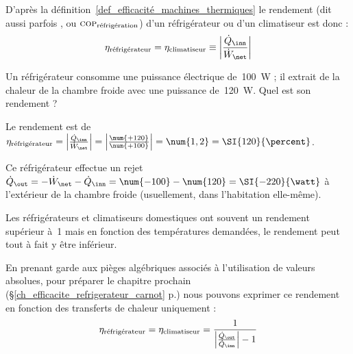		D’après la définition~\ref{def_efficacité_machines_thermiques} le rendement (dit aussi parfois , ou $\textsc{cop}_\text{réfrigération}$) d’un réfrigérateur ou d’un climatiseur est donc :
		\begin{equation}
			\eta_\text{réfrigérateur} = \eta _\text{climatiseur} \equiv \left| \frac{\dot Q_\inn}{\dot W_\net} \right|
			\label{def_rendement_climatiseur_refrigerateur}
		\end{equation}

		\onlyframabook{\clearfloats}
		\begin{anexample}
			Un réfrigérateur consomme une puissance électrique de~\SI{100}{\watt} ; il extrait de la chaleur de la chambre froide avec une puissance de~\SI{120}{\watt}. Quel est son rendement ?
	
			\begin{answer}
				Le rendement est de $\eta_\text{réfrigérateur} = \left| \frac{\dot Q_\inn}{\dot W_\net} \right| = \left| \frac{\num{+120}}{\num{+100}} \right| = \num{1,2} = \SI{120}{\percent}$.
					\begin{remark} Ce réfrigérateur effectue un rejet $\dot Q_\out = -\dot W_\net - \dot Q_\inn = \num{-100} - \num{120}= \SI{-220}{\watt}$ à l’extérieur de la chambre froide (usuellement, dans l’habitation elle-même).\end{remark}
					\begin{remark} Les réfrigérateurs et climatiseurs domestiques ont souvent un rendement supérieur à~\num{1} mais en fonction des températures demandées, le rendement peut tout à fait y être inférieur.\end{remark}
			\end{answer}
		\end{anexample}

		En prenant garde aux pièges algébriques associés à l’utilisation de valeurs absolues, pour préparer le chapitre prochain (\S\ref{ch_efficacite_refrigerateur_carnot} p.\pageref{ch_efficacite_refrigerateur_carnot}) nous pouvons exprimer ce rendement en fonction des transferts de chaleur uniquement :
		\begin{equation}
			\eta _\text{réfrigérateur} = \eta _\text{climatiseur} = \frac{1}{\left| \frac{\dot Q_\out}{\dot Q_\inn} \right| - 1}
			\label{rendement_réfrigérateur_qin_qout}
		\end{equation}





